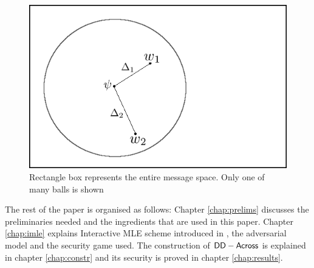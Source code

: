 \begin{figure}[H]
	\centering
	\includegraphics[scale=0.5]{example.png}
	\caption{Rectangle box represents the entire message space. Only one of many balls is shown}
	\label{fig:example}
\end{figure}

\noindent
The rest of the paper is organised as follows: Chapter \ref{chap:prelims} discusses the preliminaries needed 
and the ingredients that are used in this paper. Chapter \ref{chap:imle} explains Interactive MLE scheme
introduced in \cite{imle}, the adversarial model and the security game used. The construction of $\mathsf{DD-Across}$
is explained in chapter \ref{chap:constr} and its security is proved in chapter \ref{chap:results}.